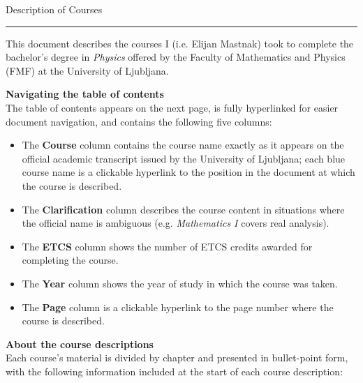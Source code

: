 \documentclass[11pt, a4paper]{article}
\begin{document}
\pagestyle{empty}  %

\begin{center}
\thispagestyle{empty}
\null
\vspace{20ex}
{\Huge Description of Courses}
\rule{0.7\textwidth}{0.5pt}
\vspace{2ex}

\begin{minipage}[t]{0.90\textwidth}
    This document describes the courses I (i.e. Elijan Mastnak) took to complete the bachelor's degree in \textit{Physics} offered by the Faculty of Mathematics and Physics (FMF) at the University of Ljubljana.

    \vspace{2ex}
    \textbf{\large Navigating the table of contents}\\[0.5ex]
    The table of contents appears on the next page, is fully hyperlinked for easier document navigation, and contains the following five columns:
    \begin{itemize}
        \item The \textbf{Course} column contains the course name exactly as it appears on the official academic transcript issued by the University of Ljubljana;
        each blue course name is a clickable hyperlink to the position in the document at which the course is described.

        \item The \textbf{Clarification} column describes the course content in situations where the official name is ambiguous (e.g. \textit{Mathematics I} covers real analysis).

        \item The \textbf{ETCS} column shows the number of ETCS credits awarded for completing the course.

        \item The \textbf{Year} column shows the year of study in which the course was taken.

        \item The \textbf{Page} column is a clickable hyperlink to the page number where the course is described.

    \end{itemize}

    \vspace{2ex}
    \textbf{\large About the course descriptions}\\[0.5ex]
    Each course's material is divided by chapter and presented in bullet-point form, with the following information included at the start of each course description:
    \begin{itemize}
    

\end{itemize}
\end{minipage}
\end{center}
\end{document}
